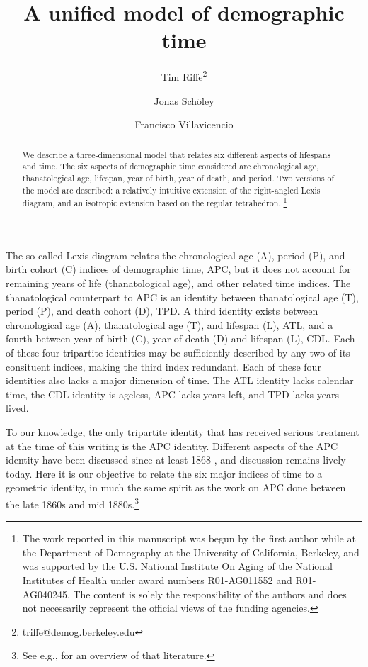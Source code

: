 \documentclass[11pt,oneside]{article} %
\newcommand\ackn[1]{%
  \begingroup
  \renewcommand\thefootnote{}\footnote{#1}%
  \addtocounter{footnote}{-1}%
  \endgroup
}
\begin{document}
\title{A unified model of demographic time}

\author[1]{Tim Riffe\thanks{triffe@demog.berkeley.edu}}
\author[2]{Jonas Sch{\"o}ley}
\author[2]{Francisco Villavicencio}



\maketitle

\begin{abstract}
We describe a three-dimensional model that relates six different aspects of
lifespans and time. The six aspects of demographic time considered are
chronological age, thanatological age, lifespan, year of birth, year of death,
and period. Two versions of the model are described: a relatively intuitive
extension of the right-angled Lexis diagram, and an isotropic extension based on
the regular tetrahedron. \ackn{The work reported in this manuscript was begun by
the first author while at the Department of Demography at the University of
California, Berkeley, and was supported by the U.S.
National Institute On Aging of the National Institutes of Health under award
numbers R01-AG011552 and R01-AG040245. The content is solely the responsibility of the authors and does not necessarily represent the official views of the funding agencies.}

\end{abstract}


The so-called Lexis diagram relates the chronological age (A), period (P), and
birth cohort (C) indices of demographic time, APC, but it does not account
for remaining years of life (thanatological age), and other related time
indices.
The thanatological counterpart to APC is an identity between thanatological age (T), period (P), and death cohort (D), TPD. A third identity exists between
chronological age (A), thanatological age (T), and lifespan (L), ATL, and a
fourth between year of birth (C), year of death (D) and lifespan (L), CDL.
Each of these four tripartite identities may be sufficiently described by any
two of its consituent indices, making the third index redundant. Each of these
four identities also lacks a major dimension of time. The ATL identity lacks
calendar time, the CDL identity is ageless, APC lacks years left, and TPD lacks years lived. 

To our knowledge, the only tripartite identity that has received serious
treatment at the time of this writing is the APC identity. Different aspects of
the APC identity have been discussed since at least 1868
\citep{knapp1868ermittlung}, and discussion remains lively today. Here it is our
objective to relate the six major indices of time to a geometric identity, in much the same spirit as the work on APC done
between the late 1860s and mid 1880s.\footnote{See e.g., \citet{keiding2011age}
for an overview of that literature.} 
\end{document}
